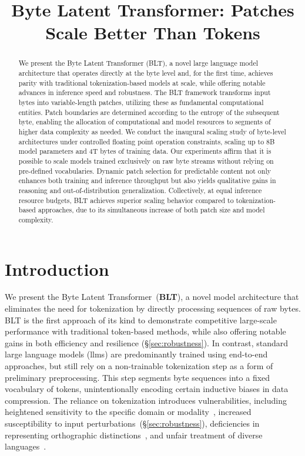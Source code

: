 \title{Byte Latent Transformer: Patches Scale Better Than Tokens}

\begin{abstract}
We present the Byte Latent Transformer (\textsc{BLT}), a novel large language model architecture that operates directly at the byte level and, for the first time, achieves parity with traditional tokenization-based models at scale, while offering notable advances in inference speed and robustness. The \textsc{BLT} framework transforms input bytes into variable-length patches, utilizing these as fundamental computational entities. Patch boundaries are determined according to the entropy of the subsequent byte, enabling the allocation of computational and model resources to segments of higher data complexity as needed. We conduct the inaugural scaling study of byte-level architectures under controlled floating point operation constraints, scaling up to 8B model parameters and 4T bytes of training data. Our experiments affirm that it is possible to scale models trained exclusively on raw byte streams without relying on pre-defined vocabularies. Dynamic patch selection for predictable content not only enhances both training and inference throughput but also yields qualitative gains in reasoning and out-of-distribution generalization. Collectively, at equal inference resource budgets, \textsc{BLT} achieves superior scaling behavior compared to tokenization-based approaches, due to its simultaneous increase of both patch size and model complexity.
\end{abstract}

\section{Introduction}
\label{section:intro}

We present the Byte Latent Transformer~(\textbf{BLT}), a novel model architecture that eliminates the need for tokenization by directly processing sequences of raw bytes. BLT is the first approach of its kind to demonstrate competitive large-scale performance with traditional token-based methods, while also offering notable gains in both efficiency and resilience (\S\ref{sec:robustness}). In contrast, standard large language models (llms) are predominantly trained using end-to-end approaches, but still rely on a non-trainable tokenization step as a form of preliminary preprocessing. This step segments byte sequences into a fixed vocabulary of tokens, unintentionally encoding certain inductive biases in data compression. The reliance on tokenization introduces vulnerabilities, including heightened sensitivity to the specific domain or modality~\citep{dagangetting}, increased susceptibility to input perturbations~(\S\ref{sec:robustness}), deficiencies in representing orthographic distinctions~\citep{edman2024cute}, and unfair treatment of diverse languages~\citep{liang2023xlm,petrov2024language,limisiewicz2024myte}.

